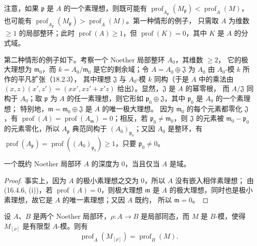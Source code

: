 \begin{env}[16.4.6.4]
\label{0.16.4.6.4-fr}
注意，如果 $\mathfrak{p}$ 是 $A$ 的一个素理想，则既可能有
$\operatorname{prof}_{A_{\mathfrak{p}}}(M_{\mathfrak{p}})
<\operatorname{prof}_A(M)$，也可能有
$\operatorname{prof}_{A_{\mathfrak{p}}}(M_{\mathfrak{p}})
>\operatorname{prof}_A(M)$。第一种情形的例子，
只需取 $A$ 为维数
$\geq1$ 的局部整环；此时 $\operatorname{prof}(A)\geq1$，但
$\operatorname{prof}(K)=0$，其中 $K$ 是 $A$ 的分式域。

第二种情形的例子如下。考察一个 Noether 局部整环 $A_0$，其维数 $\geq2$，
它的极大理想为 $\mathfrak{m}_0$，而 $k=A_0/\mathfrak{m}_0$ 是它的剩余域；令
$A=A_0\oplus\mathfrak{J}$ 为 $A_0$ 由 $A_0$-模 $k$ 所作的平凡扩张（18.2.3），
其中理想 $\mathfrak{J}$ 与 $A_0$-模 $k$ 同构（于是 $A$ 中的乘法由
$(x,z)(x',z')=(xx',xz'+x'z)$ 给出）。显然，$\mathfrak{J}$ 是 $A$ 的幂零根，
而 $A/\mathfrak{J}$ 同构于 $A_0$；取 $\mathfrak{p}$ 为 $A$ 的任一素理想，则它形如
$\mathfrak{p}_0\oplus\mathfrak{J}$，其中 $\mathfrak{p}_0$ 是 $A_0$ 的一个素理想；
特别地，$\mathfrak{m}=\mathfrak{m}_0\oplus\mathfrak{J}$ 是 $A$ 的唯一极大理想。
因为 $\mathfrak{m}_0$ 的每个元素都零化 $\mathfrak{J}$，有
$\operatorname{prof}(A)=\operatorname{prof}(A_{\mathfrak{m}})=0$；相反，若
$\mathfrak{p}_0\neq\mathfrak{m}_0$，则 $\mathfrak{J}$ 的元素被
$\mathfrak{m}_0-\mathfrak{p}_0$ 的元素零化，所以 $A_{\mathfrak{p}}$ 典范同构于
$(A_0)_{\mathfrak{p}_0}$；又因 $A_0$ 是整环，有
$\operatorname{prof}(A_{\mathfrak{p}})
=\operatorname{prof}((A_0)_{\mathfrak{p}_0})\geq1$，只要 $\mathfrak{p}_0\neq0$。
\end{env}

\begin{corollary}[16.4.7]
\label{0.16.4.7-fr}
一个既约 Noether 局部环 $A$ 的深度为 $0$，当且仅当 $A$ 是域。
\end{corollary}

\begin{proof}
事实上，因为 $A$ 的极小素理想之交为 $0$，所以 $A$ 没有嵌入相伴素理想；
由 (16.4.6, (i))，若 $\operatorname{prof}(A)=0$，则极大理想
$\mathfrak{m}$ 是 $A$ 的极大理想，同时也是极小素理想，故它是 $A$ 的唯一素理想；又因 $A$ 既约，
所以 $\mathfrak{m}=0$。
\end{proof}

\begin{proposition}[16.4.8]
\label{0.16.4.8-fr}
设 $A$、$B$ 是两个 Noether 局部环，$\rho:A\to B$ 是局部同态，而 $M$ 是
$B$-模，使得 $M_{[\rho]}$ 是有限型 $A$-模。则有
\begin{equation}
\label{0.16.4.8.1-fr}
\tag{16.4.8.1}
  \operatorname{prof}_A(M_{[\rho]})=\operatorname{prof}_B(M).
\end{equation}
\end{proposition}

